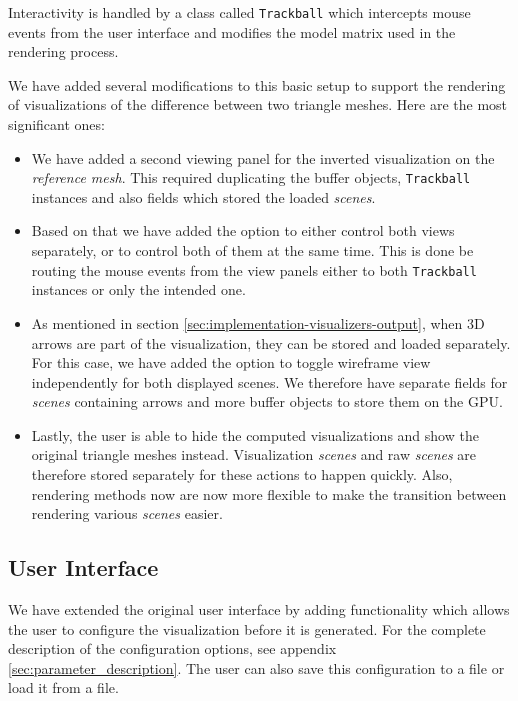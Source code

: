 Interactivity is handled by a class called \verb+Trackball+ which intercepts mouse events from the user interface and modifies the model matrix used in the rendering process.

We have added several modifications to this basic setup to support the rendering of visualizations of the difference between two triangle meshes. Here are the most significant ones:

\begin{itemize}
\item We have added a second viewing panel for the inverted visualization on the {\it reference mesh}. This required duplicating the buffer objects, \verb+Trackball+ instances and also fields which stored the loaded {\it scenes}.
\item Based on that we have added the option to either control both views separately, or to control both of them at the same time. This is done be routing the mouse events from the view panels either to both \verb+Trackball+ instances or only the intended one.
\item As mentioned in section \ref{sec:implementation-visualizers-output}, when 3D arrows are part of the visualization, they can be stored and loaded separately. For this case, we have added the option to toggle wireframe view independently for both displayed scenes. We therefore have separate fields for {\it scenes} containing arrows and more buffer objects to store them on the GPU.
\item Lastly, the user is able to hide the computed visualizations and show the original triangle meshes instead. Visualization {\it scenes} and raw {\it scenes} are therefore stored separately for these actions to happen quickly. Also, rendering methods now are now more flexible to make the transition between rendering various {\it scenes} easier.
\end{itemize}

\subsection{User Interface}

We have extended the original user interface by adding functionality which allows the user to configure the visualization before it is generated. For the complete description of the configuration options, see appendix \ref{sec:parameter_description}. The user can also save this configuration to a file or load it from a file.

